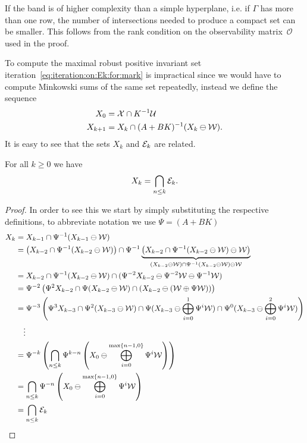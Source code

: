 %
%
\begin{rem}
If the band is of higher complexity than a simple hyperplane, i.e. if $\Gamma$ has more than one row, the number of intersections needed to produce a compact set can be smaller.
%
This follows from the rank condition on the observability matrix~$\mathcal O$ used in the proof.
\end{rem}
%
\noindent\mysplit To compute the maximal robust positive invariant set iteration~\eqref{eq:iteration:on:Ek:for:mark} is impractical since we would have to compute Minkowski sums of the same set repeatedly, instead we define the sequence
%
\begin{equation}\label{eq:MRPI:recursion}\begin{aligned}
	X_0 &= \mathcal X\cap K^{-1}\mathcal U\\
	X_{k+1} &= X_k\cap(A+BK)^{-1}(X_k\ominus\mathcal W).
\end{aligned}\end{equation}
%
It is easy to see that the sets $X_k$ and $\mathcal E_k$ are related.
%
\begin{cor}\label{thm:both:iteration:are:equivalent}
For all $k\geq0$ we have
%
\[
	X_k = \bigcap_{n\leq k}\mathcal E_k.
\]
\end{cor}
%
\begin{proof}
In order to see this we start by simply substituting the respective definitions, to abbreviate notation we use $\Psi=(A+BK)$
\begin{equation}
	\begin{aligned}
	X_k &= X_{k-1}\cap\Psi^{-1}(X_{k-1}\ominus\mathcal W)\\
	&= \left(X_{k-2}\cap\Psi^{-1}(X_{k-2}\ominus\mathcal W)\right)
	\cap\Psi^{-1}\underbrace{\left(X_{k-2}\cap\Psi^{-1}(X_{k-2}\ominus\mathcal W)\ominus\mathcal W\right)}_{(X_{k-2}\ominus\mathcal W)\cap\Psi^{-1}(X_{k-2}\ominus\mathcal W)\ominus\mathcal W}\\
	&=X_{k-2}\cap\Psi^{-1}(X_{k-2}\ominus\mathcal W)\cap(\Psi^{-2}X_{k-2}\ominus\Psi^{-2}\mathcal W\ominus\Psi^{-1}\mathcal W)\\
	&=\Psi^{-2}\left(\Psi^2 X_{k-2}\cap\Psi(X_{k-2}\ominus\mathcal W)\cap (X_{k-2}\ominus(\mathcal W\oplus\Psi\mathcal W))\right)\\
	&=\Psi^{-3}\left(\Psi^3X_{k-3}\cap\Psi^2(X_{k-3}\ominus\mathcal W)\cap\Psi(X_{k-3}\ominus\bigoplus_{i=0}^1\Psi^i \mathcal W)\cap\Psi^{0}(X_{k-3}\ominus\bigoplus_{i=0}^2\Psi^i \mathcal W) \right)\\
	&\quad\vdots\\
	&=\Psi^{-k}\left(\bigcap_{n\leq k}\Psi^{k-n}\left( X_0\ominus\bigoplus_{i=0}^{\max\{n-1,0\}}\Psi^{i}\mathcal W\right)\right)\\
	&=\bigcap_{n\leq k}\Psi^{-n}\left( X_0\ominus\bigoplus_{i=0}^{\max\{n-1,0\}}\Psi^{i}\mathcal W\right)\\
	&=\bigcap_{n\leq k} \mathcal E_k
	\end{aligned}
\end{equation}
\end{proof}
